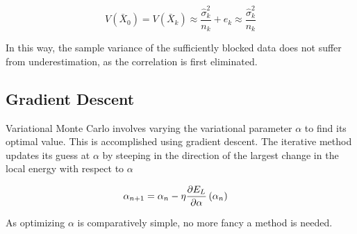\begin{equation}\label{eq:trunc}
V(\bar{X}_0) = V(\bar{X}_k) \approx \frac{\hat{\sigma}_k^2}{n_k} +  e_k \approx \frac{\hat{\sigma}_k^2}{n_k}
\end{equation}

In this way, the sample variance of the sufficiently blocked data does not suffer from underestimation, as the correlation is first eliminated. 
  

\subsection{Gradient Descent}
Variational Monte Carlo involves varying the variational parameter \(\alpha\)
to find its optimal value. This is accomplished using gradient descent. The
iterative method updates its guess at \(\alpha\) by steeping in the direction of
the largest change in the local energy with respect to \(\alpha\)

\begin{align*}
  \alpha_{n+1} &= \alpha_{n} - \eta\pdv{E_{L}}{\alpha}\left( \alpha_{n} \right)
\end{align*}

As optimizing \(\alpha\) is comparatively simple, no more fancy a method is needed.